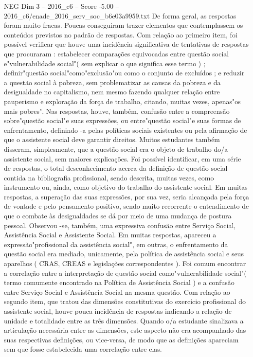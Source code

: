 \begin{textsample}{NEG Dim 3 – 2016\_c6 – Score -5.00 – 2016\_c6/enade\_2016\_serv\_soc\_b6e03a9959.txt}
De forma geral, as respostas foram muito fracas.
Poucas conseguiram trazer elementos que contemplassem os conteúdos previstos no padrão de respostas.
Com relação ao primeiro item, foi possível verificar que houve uma incidência significativa de tentativas de respostas que procuraram : estabelecer comparações equivocadas entre questão social e"vulnerabilidade social"( sem explicar o que significa esse termo ) ; definir"questão social"como"exclusão"ou como o conjunto de excluídos ; e reduzir a questão social à pobreza, sem problematizar as causas da pobreza e da desigualdade no capitalismo, nem mesmo fazendo qualquer relação entre pauperismo e exploração da força de trabalho, citando, muitas vezes, apenas"os mais pobres".
Nas respostas, houve, também, confusão entre a compreensão sobre"questão social"e suas expressões, ou entre"questão social"e suas formas de enfrentamento, definindo -a pelas políticas sociais existentes ou pela afirmação de que o assistente social deve garantir direitos.
Muitos estudantes também disseram, simplesmente, que a questão social era o objeto de trabalho do/a assistente social, sem maiores explicações.
Foi possível identificar, em uma série de respostas, o total desconhecimento acerca da definição de questão social contida na bibliografia profissional, sendo descrita, muitas vezes, como instrumento ou, ainda, como objetivo do trabalho do assistente social.
Em muitas respostas, a superação das suas expressões, por sua vez, seria alcançada pela força de vontade e pelo pensamento positivo, sendo muito recorrente o entendimento de que o combate às desigualdades se dá por meio de uma mudança de postura pessoal.
Observou -se, também, uma expressiva confusão entre Serviço Social, Assistência Social e Assistente Social.
Em muitas respostas, apareceu a expressão"profissional da assistência social", em outras, o enfrentamento da questão social era mediado, unicamente, pela política de assistência social e seus aparelhos ( CRAS, CREAS e legislações correspondentes ).
Foi comum encontrar a correlação entre a interpretação de questão social como"vulnerabilidade social"( termo comumente encontrado na Política de Assistência Social ) e a confusão entre Serviço Social e Assistência Social na mesma questão.
Com relação ao segundo item, que tratou das dimensões constitutivas do exercício profissional do assistente social, houve pouca incidência de respostas indicando a relação de unidade e totalidade entre as três dimensões.
Quando o/a estudante sinalizava a articulação necessária entre as dimensões, este aspecto não era acompanhado das suas respectivas definições, ou vice-versa, de modo que as definições apareciam sem que fosse estabelecida uma correlação entre elas.

\end{textsample}
